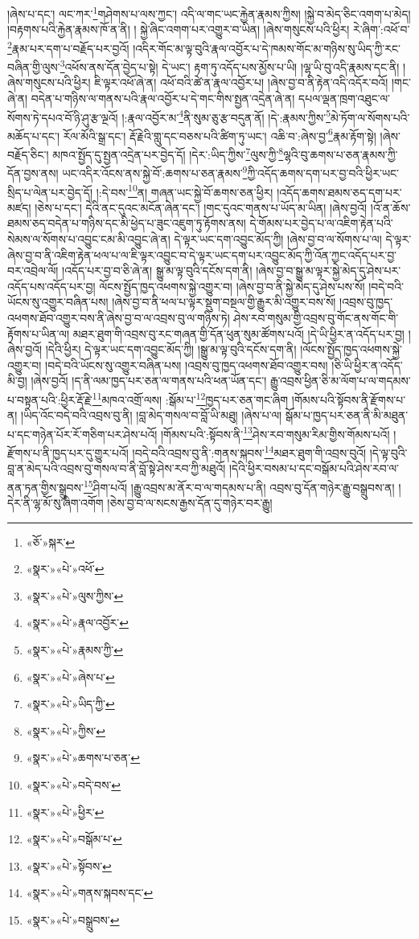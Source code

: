 །ཞེས་པ་དང་། ལང་ཀར་\footnote{«ཅོ་»སྐར་}གཤེགས་པ་ལས་ཀྱང་། འདི་ལ་གང་ཡང་རྐྱེན་རྣམས་ཀྱིས། །སྐྱེ་བ་མེད་ཅིང་འགག་པ་མེད། །བརྟགས་པའི་རྐྱེན་རྣམས་ཁོ་ན་ནི། །
སྐྱེ་ཞིང་འགག་པར་འགྱུར་བ་ཡིན། །ཞེས་གསུངས་པའི་ཕྱིར། རེ་ཞིག་:འཕོ་བ་\footnote{«སྣར་»«པེ་»འཕོ་}རྣམ་པར་དག་པ་བརྗོད་པར་བྱའོ། །འདིར་གོང་མ་ལྟ་བུའི་རྣལ་འབྱོར་པ་དེ་ཁམས་གོང་མ་གཉིས་སུ་ཡིད་ཀྱི་རང་བཞིན་གྱི་ལུས་\footnote{«སྣར་»«པེ་»ལུས་ཀྱིས་}འཕོས་ནས་དོན་བྱེད་པ་སྟེ། དེ་ཡང་། རྟག་ཏུ་འདོད་པས་མྱོས་པ་ཡི། །ལྷ་ཡི་བུ་འདི་རྣམས་དང་ནི། །ཞེས་གསུངས་པའི་ཕྱིར། ཇི་ལྟར་འཕོ་ཞེ་ན། འཕོ་བའི་ཚེ་ན་རྣལ་འབྱོར་པ། །ཞེས་བྱ་བ་ནི་རྟེན་འདི་འདོར་བའོ། །གང་ཞེ་ན། བདེན་པ་གཉིས་ལ་གནས་པའི་རྣལ་འབྱོར་པ་དེ་གང་གིས་སྤྱན་འདྲེན་ཞེ་ན། དཔལ་ལྡན་ཁྲག་འཐུང་ལ་སོགས་ཏེ་དཔའ་བོ་ཉི་ཤུ་རྩ་ལྔའོ། །:རྣལ་འབྱོར་མ་\footnote{«སྣར་»«པེ་»རྣལ་འབྱོར་}ནི་སུམ་ཅུ་རྩ་བདུན་ནོ། །དེ་:རྣམས་ཀྱིས་\footnote{«སྣར་»«པེ་»རྣམས་ཀྱི་}མེ་ཏོག་ལ་སོགས་པའི་མཆོད་པ་དང་། རོལ་མོའི་སྒྲ་དང་། རྡོ་རྗེའི་གླུ་དང་བཅས་པའི་ཚིག་ཏུ་ཡང་། འཆི་བ་:ཞེས་བྱ་\footnote{«སྣར་»«པེ་»ཞེས་པ་}རྣམ་རྟོག་སྟེ། །ཞེས་བརྗོད་ཅིང་། མཁའ་སྤྱོད་དུ་སྤྱན་འདྲེན་པར་བྱེད་དོ། །དེར་:ཡིད་ཀྱིས་\footnote{«སྣར་»«པེ་»ཡིད་ཀྱི་}ལུས་ཀྱི་\footnote{«སྣར་»«པེ་»ཀྱིས་}ལྷའི་བུ་ཆགས་པ་ཅན་རྣམས་ཀྱི་དོན་བྱས་ནས། ཡང་འདིར་འོངས་ནས་སྐྱེ་བོ་:ཆགས་པ་ཅན་རྣམས་\footnote{«སྣར་»«པེ་»ཆགས་པ་ཅན་}ཀྱི་འདོད་ཆགས་དག་པར་བྱ་བའི་ཕྱིར་ཡང་སྲིད་པ་ལེན་པར་བྱེད་དོ། །:དེ་བས་\footnote{«སྣར་»«པེ་»བདེ་བས་}ན། གཞན་ཡང་སྐྱེ་བོ་ཆགས་ཅན་ཕྱིར། །འདོད་ཆགས་ཐམས་ཅད་དག་པར་མཛད། །ཅེས་པ་དང་། དེའི་ནང་དུའང་མངོན་ཞེན་དང་། །གང་དུའང་གནས་པ་ཡོད་མ་ཡིན། །ཞེས་བྱའོ། །འོ་ན་ཆོས་ཐམས་ཅད་བདེན་པ་གཉིས་དང་མི་ཕྱེད་པ་ཟུང་འཇུག་ཏུ་རྟོགས་ནས། དེ་གོམས་པར་བྱེད་པ་ལ་འཇིག་རྟེན་པའི་སེམས་ལ་སོགས་པ་འབྱུང་ངམ་མི་འབྱུང་ཞེ་ན། དེ་ལྟར་ཡང་དག་འབྱུང་མོད་ཀྱི། །ཞེས་བྱ་བ་ལ་སོགས་པ་ལ། དེ་ལྟར་ཞེས་བྱ་བ་ནི་འཇིག་རྟེན་ཕལ་པ་ལ་ཇི་ལྟར་འབྱུང་བ་དེ་ལྟར་ཡང་དག་པར་འབྱུང་མོད་ཀྱི་འོན་ཀྱང་འདོད་པར་བྱ་བར་འབྲེལ་ལོ། །འདོད་པར་བྱ་བ་ཅི་ཞེ་ན། སྒྱུ་མ་ལྟ་བུའི་དངོས་དག་ནི། །ཞེས་བྱ་བ་སྒྱུ་མ་ལྟར་སྐྱེ་མེད་དུ་ཤེས་པར་འདོད་པས་འདོད་པར་བྱ། ལོངས་སྤྱོད་ཁྱད་འཕགས་སྐྱེ་འགྱུར་བ། །ཞེས་བྱ་བ་ནི་སྐྱེ་མེད་དུ་ཤེས་པས་སོ། །བདེ་བའི་ཡོངས་སུ་འགྱུར་བཞིན་པས། །ཞེས་བྱ་བ་ནི་ཕལ་པ་ལྟར་སྡུག་བསྔལ་གྱི་རྒྱུར་མི་འགྱུར་བས་སོ། །འབྲས་བུ་ཁྱད་འཕགས་ཐོབ་འགྱུར་བས་ནི་ཞེས་བྱ་བ་ལ་འབྲས་བུ་ལ་གཉིས་ཏེ། ཤེས་རབ་གསུམ་གྱི་འབྲས་བུ་གོང་ནས་གོང་གི་རྟོགས་པ་ཡིན་ལ། མཐར་ཐུག་གི་འབྲས་བུ་རང་གཞན་གྱི་དོན་ཕུན་སུམ་ཚོགས་པའོ། །དེ་ཡི་ཕྱིར་ན་འདོད་པར་བྱ། །ཞེས་བྱའོ། །དེའི་ཕྱིར། དེ་ལྟར་ཡང་དག་འབྱུང་མོད་ཀྱི། །སྒྱུ་མ་ལྟ་བུའི་དངོས་དག་ནི། །ལོངས་སྤྱོད་ཁྱད་འཕགས་སྐྱེ་འགྱུར་བ། །བདེ་བའི་ཡོངས་སུ་འགྱུར་བཞིན་པས། །འབྲས་བུ་ཁྱད་འཕགས་ཐོབ་འགྱུར་བས། །ཅི་ཡི་ཕྱིར་ན་འདོད་མི་བྱ། །ཞེས་བྱའོ། །ད་ནི་ལམ་ཁྱད་པར་ཅན་ལ་གནས་པའི་ཕན་ཡོན་དང་། རྒྱུ་འབྲས་ཕྱིན་ཅི་མ་ལོག་པ་ལ་གདམས་པ་བསྟན་པའི་:ཕྱིར་རྡོ་རྗེ་\footnote{«སྣར་»«པེ་»ཕྱིར་}མཁའ་འགྲོ་ལས། :སྒོམ་པ་\footnote{«སྣར་»«པེ་»བསྒོམ་པ་}ཁྱད་པར་ཅན་གང་ཞིག །གོམས་པའི་སྟོབས་ནི་རྫོགས་པ་ན། །ཡིད་འོང་བདེ་བའི་འབྲས་བུ་ནི། །བླ་མེད་གསལ་བ་བློ་ཡི་མཐུ། །ཞེས་པ་ལ། སྒོམ་པ་ཁྱད་པར་ཅན་ནི་མི་མཐུན་པ་དང་གཉེན་པོར་རོ་གཅིག་པར་ཤེས་པའོ། །གོམས་པའི་:སྟོབས་ནི་\footnote{«སྣར་»«པེ་»སྟོབས་}ཤེས་རབ་གསུམ་རིམ་གྱིས་གོམས་པའོ། །རྫོགས་པ་ནི་ཁྱད་པར་དུ་གྱུར་པའོ། །བདེ་བའི་འབྲས་བུ་ནི་:གནས་སྐབས་\footnote{«སྣར་»«པེ་»གནས་སྐབས་དང་}མཐར་ཐུག་གི་འབྲས་བུའོ། །དེ་ལྟ་བུའི་བླ་ན་མེད་པའི་འབྲས་བུ་གསལ་བ་ནི་བློ་སྟེ་ཤེས་རབ་ཀྱི་མཐུའོ། །དེའི་ཕྱིར་བསམ་པ་དང་བསྒོམ་པའི་ཤེས་རབ་ལ་ནན་ཏན་གྱིས་སྒྲུབས་\footnote{«སྣར་»«པེ་»བསྒྲུབས་}ཤིག་པའོ། །རྒྱུ་འབྲས་མ་ནོར་བ་ལ་གདམས་པ་ནི། འབྲས་བུ་དོན་གཉེར་རྒྱུ་བསྒྲུབས་ན། །དེར་ནི་ལྷ་མོ་སུ་ཞིག་འགོག །ཅེས་བྱ་བ་ལ་སངས་རྒྱས་དོན་དུ་གཉེར་བར་རྒྱུ། 